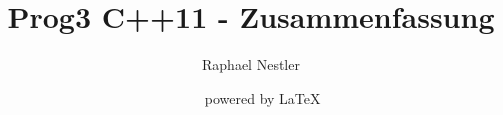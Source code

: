 \documentclass[ngerman,english]{scrartcl}
\title{Prog3 C++11 - Zusammenfassung}
\author{Raphael Nestler}
\date{\revisiondate ~ \revision ~ powered by \LaTeX}
\begin{document}
 
\twocolumn









 
\end{document}
